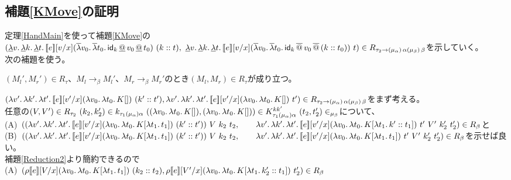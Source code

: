 \subsection{補題\ref{KMove}の証明}
定理\ref{HandMain}を使って補題\ref{KMove}の\\
$(\DLam{v}{\DLam{k}{\DLam{t}{\CPSTh{e}[\Change{x}{v}] \SLamP{v_0}{\SLam{t_0}{\DApp{\Idk}{\DApp{v_0}{t_0}}}}\ \ConsP{k}{t}}}},\\
\ \DLam{v}{\DLam{k}{\DLam{t}{\CPSTh{e}[\Change{x}{v}] \SLamP{v_0}{\SLam{t_0}{\SApp{\Idk}{\SApp{v_0}{\ConsP{k}{t_0}}}}}\ t}}})
\in R_{\tau_2 \rightarrow \TrailType{\alpha} \TrailType{\beta}}$を示していく。\\
次の補題を使う。\\
\begin{lemma}[簡約と論理関係の保存]
  $(M_l', M_r') \in R_{\tau}、M_l \rightarrow_{\beta} M_l'、M_r \rightarrow_{\beta} M_r'$のとき$(M_l, M_r) \in R_{\tau}$が成り立つ。
\label{Reduction2}
\end{lemma}
$(\Lam{v'}{\Lam{k'}{\Lam{t'}{\CPSTh{e}[\Change{x}{v'}] \LamP{v_0}{\Lam{t_0}{K[]}}\ \ConsP{k'}{t'}}}},\\
\Lam{v'}{\Lam{k'}{\Lam{t'}{\CPSTh{e}[\Change{x}{v'}] \LamP{v_0}{\Lam{t_0}{K[]}}\ t'}}})
\in R_{\tau_2 \rightarrow \TrailType{\alpha} \TrailType{\beta}}$をまず考える。
\\
任意の$(V,V')\in R_{\tau_2}\  (k_2,k_2')\in k_{\tau_1(\mu_{\alpha})\alpha}\  (\LamP{v_0}{\Lam{t_0}{K[]}},\LamP{v_0}{\Lam{t_0}{K[]}})\in K^{kk'}_{\tau_1(\mu_{\alpha})\alpha}\  (t_2,t_2')\in_{\mu_{\beta}}$について、\\
(A)\ $(\LamP{v'}{\Lam{k'}{\Lam{t'}{\CPSTh{e}[\Change{x}{v'}] \LamP{v_0}{\Lam{t_0}{K[\Lam{t_1}{t_1}]}}\ \ConsP{k'}{t'}}}}\ V\ k_2\ t_2,\\
\qquad \Lam{v'}{\Lam{k'}{\Lam{t'}{\CPSTh{e}[\Change{x}{v'}] \LamP{v_0}{\Lam{t_0}{K[\Lam{t_1}{\Cons{k'}{t_1}}]}}\ t'}}}\ V'\ k_2'\ t_2')\in R_{\beta}$と\\
(B)\ $(\LamP{v'}{\Lam{k'}{\Lam{t'}{\CPSTh{e}[\Change{x}{v'}] \LamP{v_0}{\Lam{t_0}{K[\Lam{t_1}{t_1}]}}\ \ConsP{k'}{t'}}}}\ V\ k_2\ t_2,\\
\qquad \Lam{v'}{\Lam{k'}{\Lam{t'}{\CPSTh{e}[\Change{x}{v'}] \LamP{v_0}{\Lam{t_0}{K[\Lam{t_1}{t_1}]}}\ t'}}}\ V'\ k_2'\ t_2')\in R_{\beta}$を示せば良い。\\
補題\ref{Reduction2}より簡約できるので\\
(A)\ $(\rho \CPSTh{e}[\Change{x}{V}] \LamP{v_0}{\Lam{t_0}{K[\Lam{t_1}{t_1}]}}\ \ConsP{k_2}{t_2},
 \rho \CPSTh{e}[\Change{x}{V'}] \LamP{v_0}{\Lam{t_0}{K[\Lam{t_1}{\Cons{k_2'}{t_1}}]}}\ t_2')\in R_{\beta}$\\
